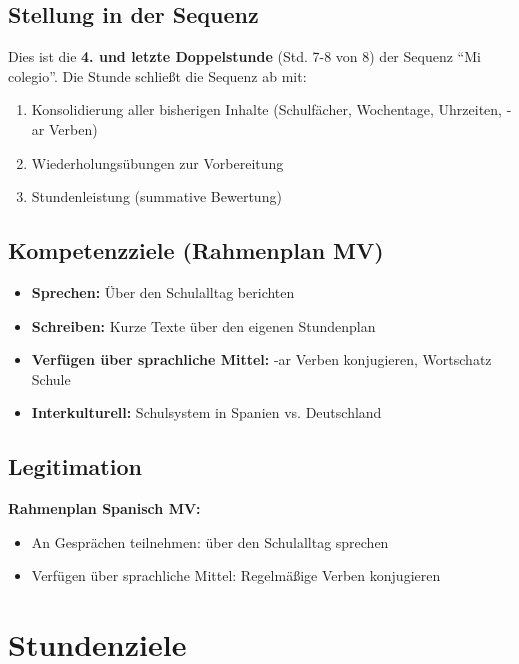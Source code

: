 \documentclass[11pt,a4paper]{article}
\newcommand{\reihenthema}{Mi colegio}
\begin{document}
\subsection{Stellung in der Sequenz}
Dies ist die \textbf{4. und letzte Doppelstunde} (Std. 7-8 von 8) der Sequenz ``\reihenthema''.
Die Stunde schließt die Sequenz ab mit:
\begin{enumerate}
    \item Konsolidierung aller bisherigen Inhalte (Schulfächer, Wochentage, Uhrzeiten, -ar Verben)
    \item Wiederholungsübungen zur Vorbereitung
    \item Stundenleistung (summative Bewertung)
\end{enumerate}

\subsection{Kompetenzziele (Rahmenplan MV)}
\begin{itemize}
    \item \textbf{Sprechen:} Über den Schulalltag berichten
    \item \textbf{Schreiben:} Kurze Texte über den eigenen Stundenplan
    \item \textbf{Verfügen über sprachliche Mittel:} -ar Verben konjugieren, Wortschatz Schule
    \item \textbf{Interkulturell:} Schulsystem in Spanien vs. Deutschland
\end{itemize}

\subsection{Legitimation}
\textbf{Rahmenplan Spanisch MV:}
\begin{itemize}
    \item An Gesprächen teilnehmen: über den Schulalltag sprechen
    \item Verfügen über sprachliche Mittel: Regelmäßige Verben konjugieren
\end{itemize}

\section{Stundenziele}
\end{document}
